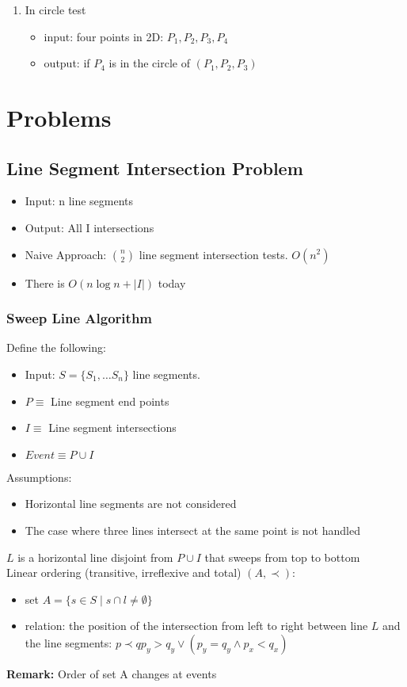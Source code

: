 \documentclass[12pt]{article}
\newcommand{\rmk}[1]{\par {\bf Remark: }{#1}}
\begin{document}
\begin{enumerate}[1)]
\item In circle test
  \begin{itemize}
  \item input: four points in 2D: $P_1, P_2, P_3, P_4$
  \item output: if $P_4$ is in the circle of $(P_1, P_2, P_3)$
  \end{itemize}
\end{enumerate}

\section{Problems}
\subsection{Line Segment Intersection Problem}
\begin{itemize}
\item Input: n line segments
\item Output: All I intersections
\item Naive Approach: ${n \choose 2}$ line segment intersection
  tests. $O(n^2)$
\item There is $O(n\log n + |I|)$ today
\end{itemize}
\subsubsection{Sweep Line Algorithm}
Define the following:\
\begin{itemize}
\item Input: $S = \{S_1, \dots S_n\}$ line segments.
\item $P \equiv$ Line segment end points
\item $I \equiv$ Line segment intersections
\item $Event \equiv P \cup I$
\end{itemize}

Assumptions: 
\begin{itemize}
\item Horizontal line segments are not considered
\item The case where three lines intersect at the same point is not
  handled
\end{itemize}
$L$ is a horizontal line disjoint from $P \cup I$ that sweeps from top
to bottom\\

Linear ordering (transitive, irreflexive and total) $(A, \prec)$: 
\begin{itemize}
\item set $A = \{s \in S \mid s \cap l \neq \emptyset\}$
\item relation: the position of the intersection from left to right
  between line $L$ and the line segments:
  $p \prec q p_y > q_y \lor (p_y = q_y \land p_x < q_x)$
\end{itemize}
\rmk{Order of set A changes at events}
\end{document}
